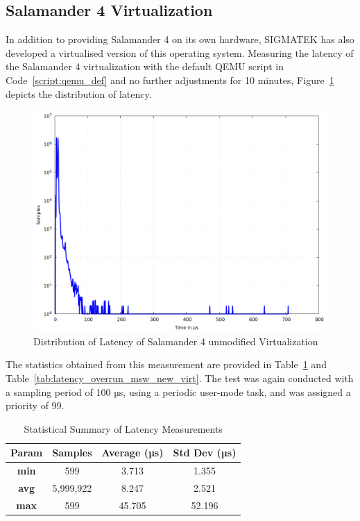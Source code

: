 \documentclass[MMR,Master,english]{twbook}
\begin{document}
\subsection{Salamander 4 Virtualization}\label{subsec:salamander4-virtualization}
In addition to providing Salamander 4 on its own hardware, SIGMATEK has also developed a virtualised version of this operating system. Measuring the latency of the Salamander 4 virtualization with the default QEMU script in Code~\ref{script:qemu_def} and no further adjustments for 10 minutes, Figure~\ref{fig:gnuplot_max_latency_default} depicts the distribution of latency. 

\begin{figure}[H]
	\centering
	\includegraphics[width=0.7\columnwidth]{masterthesis-documentation/docs/sigmatek/xenomai/1default/gnuplot_max_latency_default.png}
	\caption[Distribution of Latency of Salamander 4 unmodified Virtualization]{Distribution of Latency of Salamander 4 unmodified Virtualization}
	\label{fig:gnuplot_max_latency_default}
\end{figure}


\noindent The statistics obtained from this measurement are provided in Table~\ref{tab:latency_stats_virt} and Table~\ref{tab:latency_overrun_msw_new_virt}. The test was again conducted with a sampling period of 100 µs, using a periodic user-mode task, and was assigned a priority of 99.

\vspace{2em}
\begin{table}[H]
\centering
\begin{tabular}{|c|c|c|c|}
\hline
\textbf{Param} & \textbf{Samples} & \textbf{Average (µs)} & \textbf{Std Dev (µs)} \\ \hline
\textbf{min} & 599 & 3.713 & 1.355 \\ \hline
\textbf{avg} & 5,999,922 & 8.247 & 2.521 \\ \hline
\textbf{max} & 599 & 45.705 & 52.196 \\ \hline
\end{tabular}
\caption{Statistical Summary of Latency Measurements}
\label{tab:latency_stats_virt}
\end{table}
\end{document}

